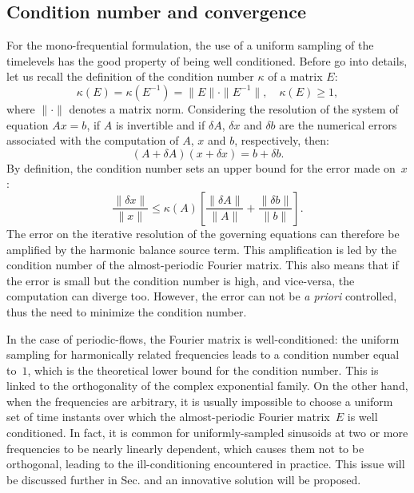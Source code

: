 \subsection{Condition number and convergence}
For the mono-frequential formulation, the use of a uniform
sampling of the timelevels has the good property of being
well conditioned.
Before go into details, let us recall the definition of the
condition number $\kappa$ of a matrix $E$:
\begin{equation}
	\kappa (E) = \kappa (E^{-1}) = \| E \| \cdot \| E^{-1} \|, \quad
    \kappa(E) \geq 1,
\end{equation}
where $\| \cdot \|$ denotes a matrix norm.  Considering the resolution
of the system of equation
$A x = b$, if $A$ is invertible and if $\delta A$, $\delta x$ and
$\delta b$ are the numerical errors associated with the computation of
$A$, $x$ and $b$, respectively, then:
\begin{equation}
   (A + \delta A)(x + \delta x) = b + \delta b.
   \label{eq:error_reso}
\end{equation}
By definition, the condition number sets an upper bound for 
the error made on~$x$:
\begin{equation}
   \frac{\| \delta x \|}{\| x \|} \leq 
   \kappa(A)\left[\frac{\| \delta A \|}{\| A \|} + 
   \frac{\| \delta b \|}{\| b \|} \right].
   \label{eq:conditonnig_amp}
\end{equation}
The error on the iterative resolution of the governing equations can
therefore be amplified by the harmonic balance source term. 
This amplification is
led by the condition number of the almost-periodic Fourier matrix. This
also means that if the error is small but the condition number is
high, and vice-versa, the computation can diverge too. However, the
error can not be \emph{a priori} controlled, thus the need to
minimize the condition number.

In the case of periodic-flows, the Fourier matrix is well-conditioned: the
uniform sampling for harmonically related frequencies leads to a
condition number equal to~$1$, which is the theoretical lower bound
for the condition number.  This is linked to the orthogonality of the
complex exponential family.  On the other hand, when the frequencies are arbitrary, it is usually
impossible to choose a uniform set of time instants over which the
almost-periodic Fourier matrix~$E$ is well conditioned. In fact, it is common for uniformly-sampled
sinusoids at two or more frequencies to be nearly linearly dependent,
which causes them not to be orthogonal, leading to the
ill-conditioning encountered in practice. This issue will be discussed
further in Sec. and an innovative
solution will be proposed.


